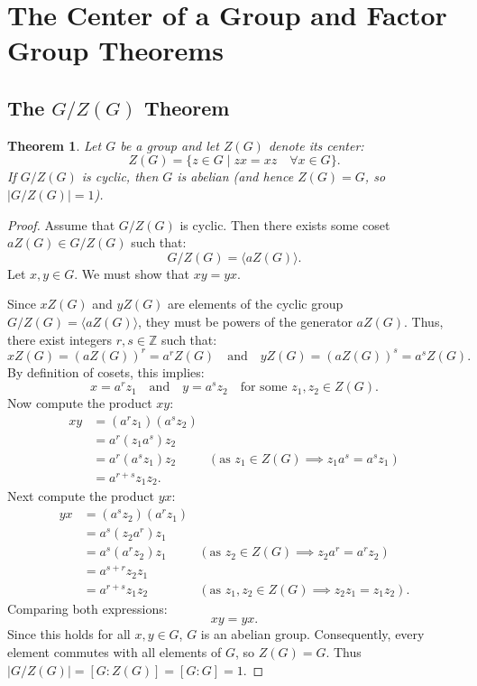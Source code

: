 \documentclass[12pt]{article}
\theoremstyle{definition}
\theoremstyle{plain}
\newtheorem{theorem}{Theorem}[section]
\begin{document}
\newpage
\section{The Center of a Group and Factor Group Theorems}

\subsection{The \texorpdfstring{$G/Z(G)$}{G/Z(G)} Theorem}

\begin{theorem}
Let $G$ be a group and let $Z(G)$ denote its center:
\[
Z(G) = \{ z \in G \mid zx = xz \quad \forall x \in G \}.
\]
If $G/Z(G)$ is cyclic, then $G$ is abelian (and hence $Z(G) = G$, so $|G/Z(G)| = 1$).
\end{theorem}

\begin{proof}
Assume that $G/Z(G)$ is cyclic.
Then there exists some coset $a Z(G) \in G/Z(G)$ such that:
\[
G/Z(G) = \langle a Z(G) \rangle.
\]
Let $x, y \in G$. We must show that $xy = yx$.

Since $x Z(G)$ and $y Z(G)$ are elements of the cyclic group $G/Z(G) = \langle a Z(G) \rangle$, they must be powers of the generator $a Z(G)$. Thus, there exist integers $r, s \in \mathbb{Z}$ such that:
\[
x Z(G) = (a Z(G))^r = a^r Z(G) \quad \text{and} \quad y Z(G) = (a Z(G))^s = a^s Z(G).
\]
By definition of cosets, this implies:
\[
x = a^r z_1 \quad \text{and} \quad y = a^s z_2 \quad \text{for some } z_1, z_2 \in Z(G).
\]
Now compute the product $xy$:
\begin{align*}
xy &= (a^r z_1)(a^s z_2) \\
&= a^r (z_1 a^s) z_2 \\
&= a^r (a^s z_1) z_2 & (\text{as } z_1 \in Z(G) \implies z_1 a^s = a^s z_1) \\
&= a^{r+s} z_1 z_2.
\end{align*}
Next compute the product $yx$:
\begin{align*}
yx &= (a^s z_2)(a^r z_1) \\
&= a^s (z_2 a^r) z_1 \\
&= a^s (a^r z_2) z_1 & (\text{as } z_2 \in Z(G) \implies z_2 a^r = a^r z_2) \\
&= a^{s+r} z_2 z_1 \\
&= a^{r+s} z_1 z_2 & (\text{as } z_1, z_2 \in Z(G) \implies z_2 z_1 = z_1 z_2).
\end{align*}
Comparing both expressions:
\[
xy = yx.
\]
Since this holds for all $x, y \in G$, $G$ is an abelian group.
Consequently, every element commutes with all elements of $G$, so $Z(G) = G$.
Thus $|G/Z(G)| = [G : Z(G)] = [G : G] = 1$.
\end{proof}
\end{document}
